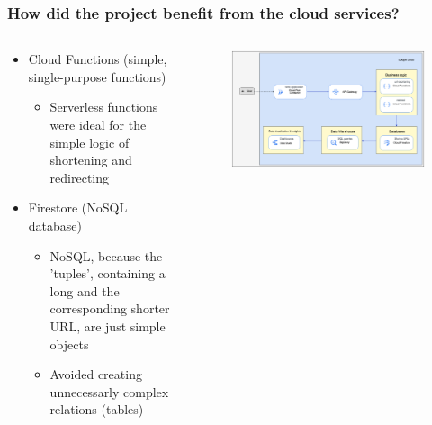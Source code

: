 \documentclass[aspectratio=169,16pt]{beamer}
\begin{document}
\begin{frame}
    \frametitle{How did the project benefit from the cloud services?}

    \begin{columns}[onlytextwidth]
        \begin{column}{0.5\textwidth}

            \begin{itemize}
                \item Cloud Functions (simple, single-purpose functions)
                      \begin{itemize}
                          \item Serverless functions were ideal for the simple logic of shortening and redirecting
                      \end{itemize}
                \item Firestore (NoSQL database)
                      \begin{itemize}
                          \item NoSQL, because the 'tuples', containing a long and the corresponding shorter URL,
                                are just simple objects
                          \item Avoided creating unnecessarly complex relations (tables)
                      \end{itemize}
            \end{itemize}

        \end{column}%
        \begin{column}{0.5\textwidth}

            \begin{center}
                \begin{figure}
                    \centering\includegraphics[height=.5\paperheight]{architecture}
                \end{figure}
            \end{center}

        \end{column}
    \end{columns}
\end{frame}
\end{document}
